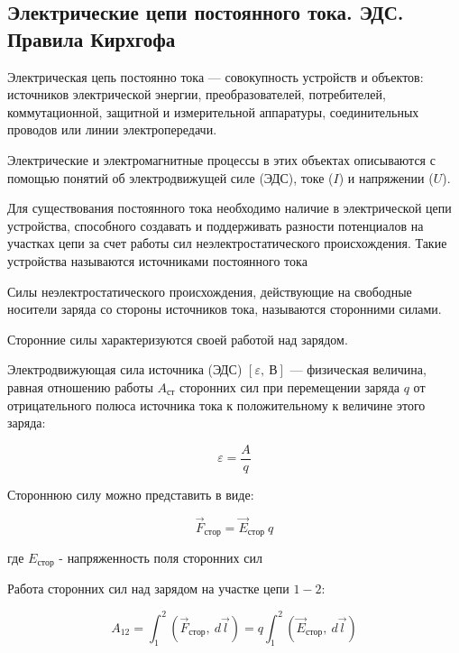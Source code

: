 \subsection{Электрические цепи постоянного тока. ЭДС. Правила Кирхгофа}

\begin{definition}
    Электрическая цепь постоянно тока — совокупность устройств и объектов: источников электрической энергии, 
    преобразователей, потребителей, коммутационной, защитной и измерительной аппаратуры, соединительных проводов 
    или линии электропередачи.

    Электрические и электромагнитные процессы в этих объектах описываются с помощью понятий об электродвижущей 
    силе (ЭДС), токе ($I$) и напряжении ($U$).
\end{definition}

\begin{remark}
    Для существования постоянного тока необходимо наличие в электрической цепи устройства, способного создавать и 
    поддерживать разности потенциалов на участках цепи за счет работы сил неэлектростатического происхождения. 
    Такие устройства называются источниками постоянного тока
\end{remark}

Силы неэлектростатического происхождения, действующие на свободные носители заряда со стороны источников тока, 
называются сторонними силами.

Сторонние силы характеризуются своей работой над зарядом.

\begin{definition}
    Электродвижующая сила источника (ЭДС) $[\varepsilon,\ В]$ — физическая величина, равная отношению работы $A_{ст}$ сторонних сил при перемещении заряда $q$ от отрицательного полюса источника тока к положительному к величине этого заряда:

    $$
    \varepsilon=\frac{A}{q}
    $$
\end{definition}

Стороннюю силу можно представить в виде:

$$
\vec F_{стор}=\vec E_{стор}\ q
$$

где $E_{стор}$ - напряженность поля сторонних сил

\begin{definition}
    Работа сторонних сил над зарядом на участке цепи $1-2$:

    $$
    A_{12}=\int_1^2(\vec F_{стор},\ d\vec l)=q\int_1^2(\vec E_{стор},\ d\vec l)
    $$
\end{definition}

